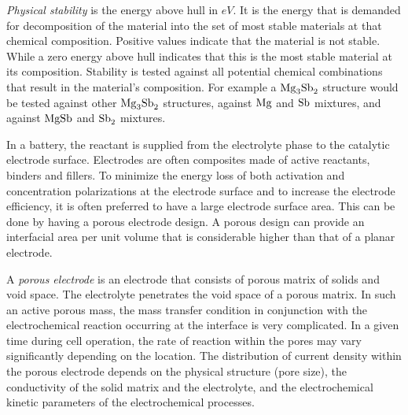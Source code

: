 	 \textit{Physical stability} is the energy above hull in $\si{eV}$. It is the energy that is demanded for decomposition of the material into the set of most stable materials at that chemical composition. Positive values indicate that the material is not stable. While a zero energy above hull indicates that this is the most stable material at its composition. Stability is tested against all potential chemical combinations that result in the material's composition. For example a $\ce{Mg_3Sb_2}$ structure would be tested against other $\ce{Mg_3Sb_2}$ structures, against $\ce{Mg}$ and $\ce{Sb}$ mixtures, and against $\ce{MgSb}$ and $\ce{Sb_2}$ mixtures. 
	
	In a battery, the reactant is supplied from the electrolyte phase to the catalytic electrode surface. Electrodes are often composites made of active reactants, binders and fillers. To minimize the energy loss of both activation and concentration polarizations at the electrode surface and to increase the electrode efficiency, it is often preferred to have a large electrode surface area. This can be done by having a porous electrode design. A porous design can provide an interfacial area per unit volume that is considerable higher than that of a planar electrode. 
	
	A \textit{porous electrode} is an electrode that consists of porous matrix of solids and void space. The electrolyte penetrates the void space of a porous matrix. In such an active porous mass, the mass transfer condition in conjunction with the electrochemical reaction occurring at the interface is very complicated. In a given time during cell operation, the rate of reaction within the pores may vary significantly depending on the location. The distribution of current density within the porous electrode depends on the physical structure (pore size), the conductivity of the solid matrix and the electrolyte, and the electrochemical kinetic parameters of the electrochemical processes.  
	



		




